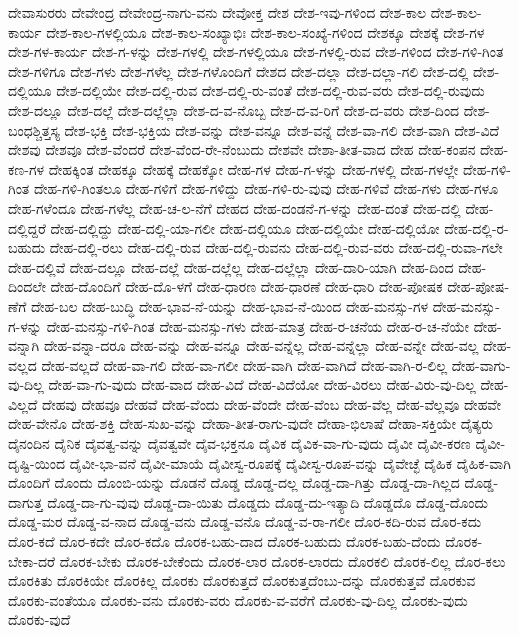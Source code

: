 {ದೇವಾಸುರರು
ದೇವೇಂದ್ರ
ದೇವೇಂದ್ರ-ನಾಗು-ವನು
ದೇವೋಕ್ತ
ದೇಶ
ದೇಶ-ಇವು-ಗಳಿಂದ
ದೇಶ-ಕಾಲ
ದೇಶ-ಕಾಲ-ಕಾರ್ಯ
ದೇಶ-ಕಾಲ-ಗಳಲ್ಲಿಯೂ
ದೇಶ-ಕಾಲ-ಸಂಖ್ಯಾಭಿಃ
ದೇಶ-ಕಾಲ-ಸಂಖ್ಯೆ-ಗಳಿಂದ
ದೇಶಕ್ಕೂ
ದೇಶಕ್ಕೆ
ದೇಶ-ಗಳ
ದೇಶ-ಗಳ-ಕಾರ್ಯ
ದೇಶ-ಗ-ಳನ್ನು
ದೇಶ-ಗಳಲ್ಲಿ
ದೇಶ-ಗಳಲ್ಲಿಯೂ
ದೇಶ-ಗಳಲ್ಲಿ-ರುವ
ದೇಶ-ಗಳಿಂದ
ದೇಶ-ಗಳಿ-ಗಿಂತ
ದೇಶ-ಗಳಿಗೂ
ದೇಶ-ಗಳು
ದೇಶ-ಗಳೆಲ್ಲ
ದೇಶ-ಗಳೊಂದಿಗೆ
ದೇಶದ
ದೇಶ-ದಲ್ಲಾ
ದೇಶ-ದಲ್ಲಾ-ಗಲಿ
ದೇಶ-ದಲ್ಲಿ
ದೇಶ-ದಲ್ಲಿಯೂ
ದೇಶ-ದಲ್ಲಿಯೇ
ದೇಶ-ದಲ್ಲಿ-ರುವ
ದೇಶ-ದಲ್ಲಿ-ರು-ವಂತೆ
ದೇಶ-ದಲ್ಲಿ-ರುವ-ವರು
ದೇಶ-ದಲ್ಲಿ-ರುವುದು
ದೇಶ-ದಲ್ಲೂ
ದೇಶ-ದಲ್ಲೆ
ದೇಶ-ದಲ್ಲೆಲ್ಲಾ
ದೇಶ-ದ-ವ-ನೊಬ್ಬ
ದೇಶ-ದ-ವ-ರಿಗೆ
ದೇಶ-ದ-ವರು
ದೇಶ-ದಿಂದ
ದೇಶ-ಬಂಧಶ್ಚಿತ್ತಸ್ಯ
ದೇಶ-ಭಕ್ತಿ
ದೇಶ-ಭಕ್ತಿಯ
ದೇಶ-ವನ್ನು
ದೇಶ-ವನ್ನೂ
ದೇಶ-ವನ್ನೆ
ದೇಶ-ವಾ-ಗಲಿ
ದೇಶ-ವಾಗಿ
ದೇಶ-ವಿದೆ
ದೇಶವು
ದೇಶವೂ
ದೇಶ-ವೆಂದರೆ
ದೇಶ-ವೆಂದ-ರೇ-ನೆಂಬುದು
ದೇಶವೇ
ದೇಶಾ-ತೀತ-ವಾದ
ದೇಹ
ದೇಹ-ಕಂಪನ
ದೇಹ-ಕಣ-ಗಳ
ದೇಹಕ್ಕಿಂತ
ದೇಹಕ್ಕೂ
ದೇಹಕ್ಕೆ
ದೇಹಕ್ಕೋ
ದೇಹ-ಗಳ
ದೇಹ-ಗ-ಳನ್ನು
ದೇಹ-ಗಳಲ್ಲಿ
ದೇಹ-ಗಳಲ್ಲೇ
ದೇಹ-ಗಳಿ-ಗಿಂತ
ದೇಹ-ಗಳಿ-ಗಿಂತಲೂ
ದೇಹ-ಗಳಿಗೆ
ದೇಹ-ಗಳಿದ್ದು
ದೇಹ-ಗಳಿ-ರು-ವುವು
ದೇಹ-ಗಳಿವೆ
ದೇಹ-ಗಳು
ದೇಹ-ಗಳೂ
ದೇಹ-ಗಳೆಂದೂ
ದೇಹ-ಗಳೆಲ್ಲ
ದೇಹ-ಚ-ಲ-ನೆಗೆ
ದೇಹದ
ದೇಹ-ದಂಡನೆ-ಗ-ಳನ್ನು
ದೇಹ-ದಂತೆ
ದೇಹ-ದಲ್ಲಿ
ದೇಹ-ದಲ್ಲಿದ್ದರೆ
ದೇಹ-ದಲ್ಲಿದ್ದು
ದೇಹ-ದಲ್ಲಿ-ಯಾ-ಗಲೀ
ದೇಹ-ದಲ್ಲಿಯೂ
ದೇಹ-ದಲ್ಲಿಯೇ
ದೇಹ-ದಲ್ಲಿಯೋ
ದೇಹ-ದಲ್ಲಿ-ರ-ಬಹುದು
ದೇಹ-ದಲ್ಲಿ-ರಲು
ದೇಹ-ದಲ್ಲಿ-ರುವ
ದೇಹ-ದಲ್ಲಿ-ರುವನು
ದೇಹ-ದಲ್ಲಿ-ರುವ-ವರು
ದೇಹ-ದಲ್ಲಿ-ರುವಾ-ಗಲೇ
ದೇಹ-ದಲ್ಲಿವೆ
ದೇಹ-ದಲ್ಲೂ
ದೇಹ-ದಲ್ಲೆ
ದೇಹ-ದಲ್ಲೆಲ್ಲ
ದೇಹ-ದಲ್ಲೆಲ್ಲಾ
ದೇಹ-ದಾರಿ-ಯಾಗಿ
ದೇಹ-ದಿಂದ
ದೇಹ-ದಿಂದಲೇ
ದೇಹ-ದೊಂದಿಗೆ
ದೇಹ-ದೊ-ಳಗೆ
ದೇಹ-ಧಾರಣ
ದೇಹ-ಧಾರಣೆ
ದೇಹ-ಧಾರಿ
ದೇಹ-ಪೋಷಕ
ದೇಹ-ಪೋಷ-ಣೆಗೆ
ದೇಹ-ಬಲ
ದೇಹ-ಬುದ್ಧಿ
ದೇಹ-ಭಾವ-ನೆ-ಯನ್ನು
ದೇಹ-ಭಾವ-ನೆ-ಯಿಂದ
ದೇಹ-ಮನಸ್ಸು-ಗಳ
ದೇಹ-ಮನಸ್ಸು-ಗ-ಳನ್ನು
ದೇಹ-ಮನಸ್ಸು-ಗಳಿ-ಗಿಂತ
ದೇಹ-ಮನಸ್ಸು-ಗಳು
ದೇಹ-ಮಾತ್ರ
ದೇಹ-ರ-ಚನೆಯ
ದೇಹ-ರ-ಚ-ನೆಯೇ
ದೇಹ-ವನ್ನಾಗಿ
ದೇಹ-ವನ್ನಾ-ದರೂ
ದೇಹ-ವನ್ನು
ದೇಹ-ವನ್ನೂ
ದೇಹ-ವನ್ನೆಲ್ಲ
ದೇಹ-ವನ್ನೆಲ್ಲಾ
ದೇಹ-ವನ್ನೇ
ದೇಹ-ವಲ್ಲ
ದೇಹ-ವಲ್ಲದ
ದೇಹ-ವಲ್ಲದೆ
ದೇಹ-ವಾ-ಗಲಿ
ದೇಹ-ವಾ-ಗಲೀ
ದೇಹ-ವಾಗಿ
ದೇಹ-ವಾಗಿದೆ
ದೇಹ-ವಾಗಿ-ರ-ಲಿಲ್ಲ
ದೇಹ-ವಾಗು-ವು-ದಿಲ್ಲ
ದೇಹ-ವಾ-ಗು-ವುದು
ದೇಹ-ವಾದ
ದೇಹ-ವಿದೆ
ದೇಹ-ವಿದೆಯೋ
ದೇಹ-ವಿರಲು
ದೇಹ-ವಿರು-ವು-ದಿಲ್ಲ
ದೇಹ-ವಿಲ್ಲದೆ
ದೇಹವು
ದೇಹವೂ
ದೇಹವೆ
ದೇಹ-ವೆಂದು
ದೇಹ-ವೆಂದೇ
ದೇಹ-ವೆಂಬ
ದೇಹ-ವೆಲ್ಲ
ದೇಹ-ವೆಲ್ಲವೂ
ದೇಹವೇ
ದೇಹ-ವೇನೊ
ದೇಹ-ಶಕ್ತಿ
ದೇಹ-ಸುಖ-ವನ್ನು
ದೇಹಾ-ತೀತ-ರಾಗು-ವುದೇ
ದೇಹಾ-ಭಿಲಾಷೆ
ದೇಹಾ-ಸಕ್ತಿಯೇ
ದೈತ್ಯರು
ದೈನಂದಿನ
ದೈನಿಕ
ದೈವತ್ವ-ವನ್ನು
ದೈವತ್ವವೇ
ದೈವ-ಭಕ್ತನೂ
ದೈವಿಕ
ದೈವಿಕ-ವಾ-ಗು-ವುದು
ದೈವೀ
ದೈವೀ-ಕರಣ
ದೈವೀ-ದೃಷ್ಟಿ-ಯಿಂದ
ದೈವೀ-ಭಾ-ವನೆ
ದೈವೀ-ಮಾಯೆ
ದೈವೀಸ್ವ-ರೂಪಕ್ಕೆ
ದೈವೀಸ್ವ-ರೂಪ-ವನ್ನು
ದೈವೇಚ್ಛೆ
ದೈಹಿಕ
ದೈಹಿಕ-ವಾಗಿ
ದೊಂದಿಗೆ
ದೊಂದು
ದೊಂಬಿ-ಯನ್ನು
ದೊಡನೆ
ದೊಡ್ಡ
ದೊಡ್ಡ-ದಲ್ಲ
ದೊಡ್ಡ-ದಾ-ಗಿತ್ತು
ದೊಡ್ಡ-ದಾ-ಗಿಲ್ಲದ
ದೊಡ್ಡ-ದಾಗುತ್ತ
ದೊಡ್ಡ-ದಾ-ಗು-ವುವು
ದೊಡ್ಡ-ದಾ-ಯಿತು
ದೊಡ್ಡದು
ದೊಡ್ಡ-ದು-ಇತ್ಯಾದಿ
ದೊಡ್ಡದೊ
ದೊಡ್ಡ-ದೊಂದು
ದೊಡ್ಡ-ಮರ
ದೊಡ್ಡ-ವ-ನಾದ
ದೊಡ್ಡ-ವನು
ದೊಡ್ಡ-ವನೊ
ದೊಡ್ಡ-ವ-ರಾ-ಗಲೀ
ದೊರ-ಕದಿ-ರುವ
ದೊರ-ಕದು
ದೊರ-ಕದೆ
ದೊರ-ಕದೇ
ದೊರ-ಕದೊ
ದೊರಕ-ಬಹು-ದಾದ
ದೊರಕ-ಬಹುದು
ದೊರಕ-ಬಹು-ದೆಂದು
ದೊರಕ-ಬೇಕಾ-ದರೆ
ದೊರಕ-ಬೇಕು
ದೊರಕ-ಬೇಕೆಂದು
ದೊರಕ-ಲಾರ
ದೊರಕ-ಲಾರದು
ದೊರಕಲಿ
ದೊರಕ-ಲಿಲ್ಲ
ದೊರ-ಕಲು
ದೊರಕಿತು
ದೊರಕಿಯೇ
ದೊರಕಿಲ್ಲ
ದೊರಕು
ದೊರಕುತ್ತದೆ
ದೊರಕುತ್ತದೆಂಬು-ದನ್ನು
ದೊರಕುತ್ತವೆ
ದೊರಕುವ
ದೊರಕು-ವಂತೆಯೂ
ದೊರಕು-ವನು
ದೊರಕು-ವರು
ದೊರಕು-ವ-ವರೆಗೆ
ದೊರಕು-ವು-ದಿಲ್ಲ
ದೊರಕು-ವುದು
ದೊರಕು-ವುದೆ
}
